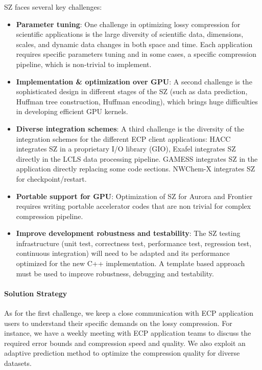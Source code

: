 SZ faces several key challenges:
\begin{itemize}
\item \textbf{Parameter tuning}: One challenge in optimizing lossy compression for scientific applications is the large
diversity of scientific data, dimensions, scales, and dynamic data changes in both space and time. Each application requires specific parameters tuning and in some cases, a specific compression pipeline, which is non-trivial to implement.
\item \textbf{Implementation \& optimization over GPU}: A second challenge is the sophisticated design in different stages of the SZ (such as data prediction, Huffman tree construction, Huffman encoding), which brings huge difficulties in developing efficient GPU kernels.  
\item \textbf{Diverse integration schemes}: A third challenge is the diversity of the integration schemes for the different ECP client applications: HACC integrates SZ in a proprietary I/O library (GIO), Exafel integrates SZ directly in the LCLS data processing pipeline. GAMESS integrates SZ in the application directly replacing some code sections. NWChem-X integrates SZ for checkpoint/restart. 
\item \textbf{Portable support for GPU}: Optimization of SZ for Aurora and Frontier requires writing portable accelerator codes that are non trivial for complex compression pipeline. 
\item \textbf{Improve development robustness and testability}: The SZ testing infrastructure (unit test, correctness test, performance test, regression test, continuous integration) will need to be adapted and its performance optimized for the new C++ implementation. A template based approach must be used to improve robustness, debugging and testability.
\end{itemize}

\paragraph{Solution Strategy}

As for the first challenge, we keep a close communication with ECP application users to understand their specific demands on the lossy compression. For instance, we have a weekly meeting with ECP application teams to discuss the required error bounds and compression speed and quality. We also exploit an adaptive prediction method to optimize the compression quality for diverse datasets. 

